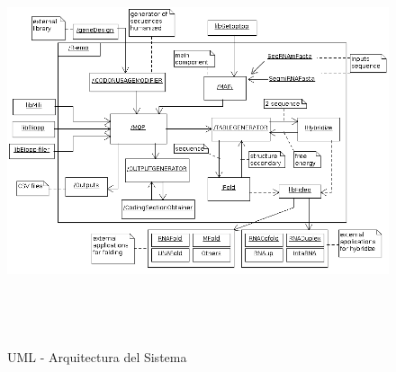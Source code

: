 \documentclass[12pt,a4paper,spanish]{article}
\begin{document}
\begin{figure}[!hbtp]
	\begin{center}
		\includegraphics[width=20cm, height=12cm, angle=90]{image/architecture.png}
		\caption{UML - Arquitectura del Sistema}
		\label{arquitecture}
	\end{center}
\end{figure}
\end{document}
